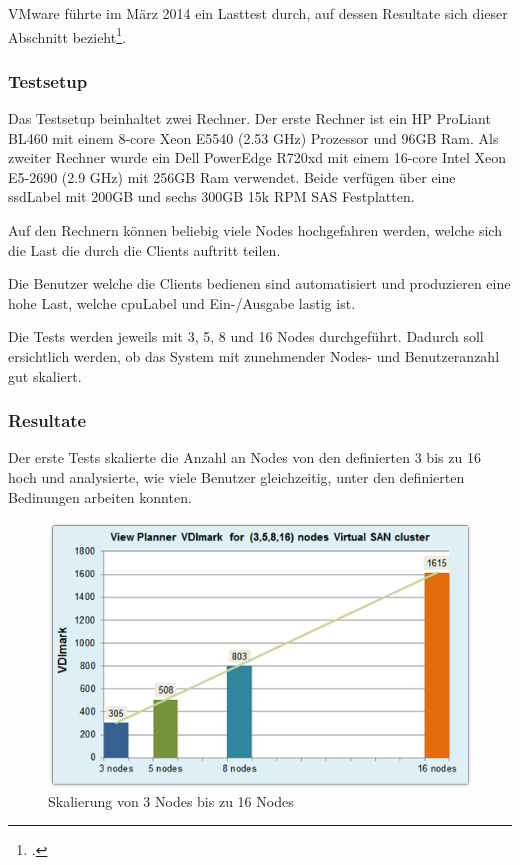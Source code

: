 VMware führte im März 2014 ein Lasttest durch, auf dessen Resultate sich dieser Abschnitt bezieht\footcite{VDI_Performance}.

\subsubsection{Testsetup}
Das Testsetup beinhaltet zwei Rechner. Der erste Rechner ist ein HP ProLiant BL460 mit einem 8-core Xeon E5540 (2.53 GHz) Prozessor und 96GB Ram. Als zweiter Rechner wurde ein Dell PowerEdge R720xd mit einem 16-core Intel Xeon E5-2690 (2.9 GHz) mit 256GB Ram verwendet.
Beide verfügen über eine \Gls{ssdLabel} mit 200GB und sechs 300GB 15k RPM SAS Festplatten.

Auf den Rechnern können beliebig viele Nodes hochgefahren werden, welche sich die Last die durch die Clients auftritt teilen.

Die Benutzer welche die Clients bedienen sind automatisiert und produzieren eine hohe Last, welche \Gls{cpuLabel} und Ein-/Ausgabe lastig ist.

Die Tests werden jeweils mit 3, 5, 8 und 16 Nodes durchgeführt. Dadurch soll ersichtlich werden, ob das System mit zunehmender Nodes- und Benutzeranzahl gut skaliert.

\subsubsection{Resultate}
Der erste Tests skalierte die Anzahl an Nodes von den definierten 3 bis zu 16 hoch und analysierte, wie viele Benutzer gleichzeitig, unter den definierten Bedinungen arbeiten konnten.

\begin{figure}[H]
	\includegraphics[width=\textwidth]{images/vmware-vdm-scale}
	\caption{Skalierung von 3 Nodes bis zu 16 Nodes}
	\label{fig:vdmPerformanceScale}
\end{figure}

